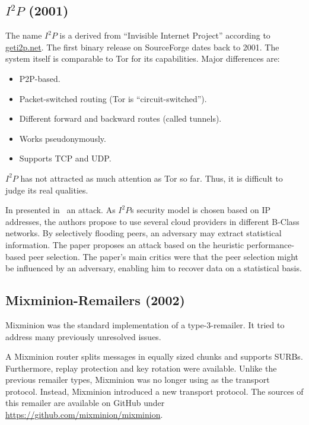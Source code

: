 \subsection{\texorpdfstring{$I^2P$}{I2P} (2001)}
The name $I^2P$ is a derived from  ``Invisible Internet Project'' according to \href{https://geti2p.net/}{geti2p.net}. The first binary release on SourceForge dates back to 2001. The system itself is comparable to Tor for its capabilities. Major differences are:
\begin{itemize}
	\item P2P-based.
	\item Packet-switched routing (Tor is ``circuit-switched'').
	\item Different forward and backward routes (called tunnels).
	\item Works pseudonymously.
	\item Supports TCP and UDP.
\end{itemize}

$I^2P$ has not attracted as much attention as Tor so far. Thus, it is difficult to judge its real qualities.

In \citeyear{pets2011-i2p} \citeauthor{pets2011-i2p} presented in~\cite{pets2011-i2p} an attack. As $I^2P$s security model is chosen based on IP addresses, the authors propose to use several cloud providers in different B-Class networks. By selectively flooding peers, an adversary may extract statistical information. The paper proposes an attack based on the heuristic performance-based peer selection. The paper's main critics were that the peer selection might be influenced by an adversary, enabling him to recover data on a statistical basis.

\subsection{Mixminion-Remailers (2002)\label{sec:remMixminion}}
Mixminion was the standard implementation of a type-3-remailer. It tried to address many previously unresolved issues. 

A Mixminion router splits messages in equally sized chunks and supports SURBs. Furthermore,  replay protection and key rotation were available. Unlike the previous remailer types, Mixminion was no longer using  as the transport protocol. Instead, Mixminion introduced a new transport protocol. The sources of this remailer are available on GitHub under \url{https://github.com/mixminion/mixminion}.

